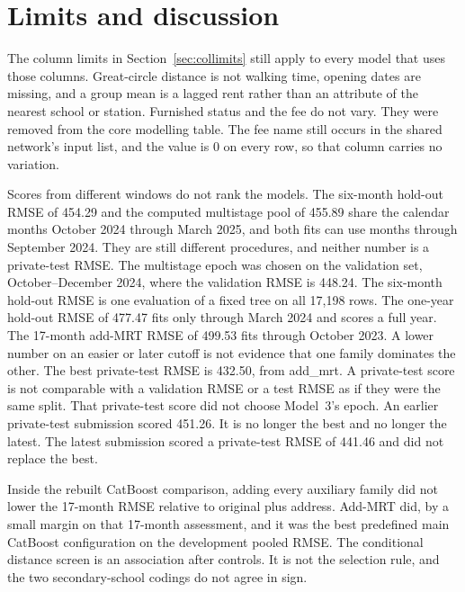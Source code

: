 \documentclass[11pt,a4paper]{article}
\begin{document}
\FloatBarrier
\section{Limits and discussion}
\label{sec:limits}

The column limits in Section~\ref{sec:collimits} still apply to every model that uses those columns.
Great-circle distance is not walking time, opening dates are missing, and a group mean is a lagged rent rather than an attribute of the nearest school or station.
Furnished status and the fee do not vary.
They were removed from the core modelling table.
The fee name still occurs in the shared network's input list, and the value is 0 on every row, so that column carries no variation.

Scores from different windows do not rank the models.
The six-month hold-out RMSE of 454.29 and the computed multistage pool of 455.89 share the calendar months October 2024 through March 2025, and both fits can use months through September 2024.
They are still different procedures, and neither number is a private-test RMSE.
The multistage epoch was chosen on the validation set, October--December 2024, where the validation RMSE is 448.24.
The six-month hold-out RMSE is one evaluation of a fixed tree on all 17{,}198 rows.
The one-year hold-out RMSE of 477.47 fits only through March 2024 and scores a full year.
The 17-month add-MRT RMSE of 499.53 fits through October 2023.
A lower number on an easier or later cutoff is not evidence that one family dominates the other.
The best private-test RMSE is 432.50, from add\_mrt.
A private-test score is not comparable with a validation RMSE or a test RMSE as if they were the same split.
That private-test score did not choose Model~3's epoch.
An earlier private-test submission scored 451.26.
It is no longer the best and no longer the latest.
The latest submission scored a private-test RMSE of 441.46 and did not replace the best.

Inside the rebuilt CatBoost comparison, adding every auxiliary family did not lower the 17-month RMSE relative to original plus address.
Add-MRT did, by a small margin on that 17-month assessment, and it was the best predefined main CatBoost configuration on the development pooled RMSE.
The conditional distance screen is an association after controls.
It is not the selection rule, and the two secondary-school codings do not agree in sign.
\end{document}
